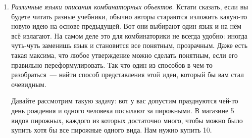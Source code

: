 \documentclass[russian]{lecture-notes}
\theoremstyle{definition}
\newtheorem*{solution}{Решение}
\begin{document}
\begin{enumerate}
		Я еще раз повторю это для тех, кто будет видео слушать, что есть подозрение, что все-таки не 19, а 18 способов размена, и что где-то вычислениях была сделана ошибка, поэтому ее надо найти каждому отдельно. 
		
		\begin{solution}
			А теперь перейдем к этой задаче есть у кого-нибудь идея или мне показать решение? Идея вот какая: если мы одну из троек, первую или вторую, дополним до 9, то есть вместо этих трех цифр (обведены в квадрат), мы напишем разности:
			
			\[
				\begin{array}{cc}
				& 999 \\
				127 & \fbox{541} \\
				& 458
				\end{array} \longleftrightarrow \underbrace{127458}_{\sum = 27}
			\]
			
			Получившийся номер будет иметь сумму цифр 27 согласны? Ну, понятно, смотрите, значит номер $541$ с $458$ дает три девятки, но сумма цифр $127$ и $541$ одинаковы, поэтому $127$ с $458$ тоже дадут три девятки. Ну, в точности наоборот, если вы теперь из трех девяток отнимите $458$, естественно, вернетесь к исходному. Поэтому, раз это правило работает и туда и сюда, мы установили взаимное однозначное соответствие. Видите, какие простые и в то же время трудные задачи легко получаются в комбинаторике.
		\end{solution}
		
		Но и еще один интересный принцип или интересную идею мы рассмотрим, которая связана с различными языками описания комбинаторных объектов.
		
		
		\item \emph{Различные языки описания комбинаторных объектов}. Кстати сказать, если вы будете читать разные учебники, обычно авторы стараются изложить какую-то новую идею на основе предыдущей. Вот они выбирают один язык и на нём всё излагают. На самом деле это для комбинаторики не всегда удобно: иногда чуть-чуть заменишь язык и становится все понятным, прозрачным. Даже есть такая максима, что любое утверждение можно сделать понятным, если его правильно переформулировать. Так что один из способов в чем-то разобраться~--- найти способ представления этой идеи, который бы вам стал очевидным.
		
		Давайте рассмотрим такую задачу: вот у вас допустим празднуются чей-то день рождения и одного человека посылают за пирожными. В магазине 5 видов пирожных, каждого из которых достаточно много, чтобы можно было купить хотя бы все пирожные одного вида. Нам нужно купить 10.
		

\end{enumerate}
\end{document}
